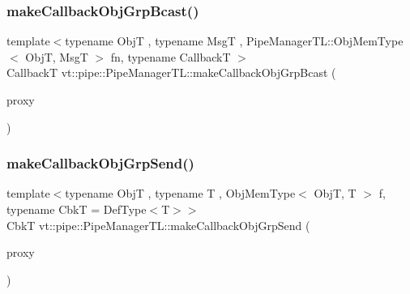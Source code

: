 \mbox{\label{structvt_1_1pipe_1_1_pipe_manager_t_l_a9caf63b8c6577acd4884933c1b9cc886}} 
\subsubsection{\texorpdfstring{make\+Callback\+Obj\+Grp\+Bcast()}{makeCallbackObjGrpBcast()}\hspace{0.1cm}{\footnotesize\ttfamily [2/2]}}
{\footnotesize\ttfamily template$<$typename ObjT , typename MsgT , Pipe\+Manager\+T\+L\+::\+Obj\+Mem\+Type$<$ Obj\+T, Msg\+T $>$ fn, typename CallbackT $>$ \\
CallbackT vt\+::pipe\+::\+Pipe\+Manager\+T\+L\+::make\+Callback\+Obj\+Grp\+Bcast (\begin{DoxyParamCaption}\item[{\hyperlink{structvt_1_1objgroup_1_1proxy_1_1_proxy}{objgroup\+::proxy\+::\+Proxy}$<$ ObjT $>$}]{proxy }\end{DoxyParamCaption})}

\mbox{\label{structvt_1_1pipe_1_1_pipe_manager_t_l_a98f92fd3f75e48766b55c7b7253c19b4}} 
\subsubsection{\texorpdfstring{make\+Callback\+Obj\+Grp\+Send()}{makeCallbackObjGrpSend()}\hspace{0.1cm}{\footnotesize\ttfamily [1/2]}}
{\footnotesize\ttfamily template$<$typename ObjT , typename T , Obj\+Mem\+Type$<$ Obj\+T, T $>$ f, typename CbkT  = Def\+Type$<$\+T$>$$>$ \\
CbkT vt\+::pipe\+::\+Pipe\+Manager\+T\+L\+::make\+Callback\+Obj\+Grp\+Send (\begin{DoxyParamCaption}\item[{\hyperlink{structvt_1_1objgroup_1_1proxy_1_1_proxy_elm}{objgroup\+::proxy\+::\+Proxy\+Elm}$<$ ObjT $>$}]{proxy }\end{DoxyParamCaption})}


